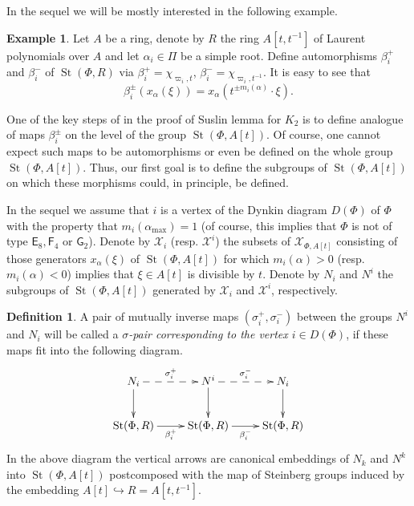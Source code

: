 \documentclass[oneside, 10pt]{amsart}
\DeclareMathOperator{\St}{St}
\DeclareMathOperator{\GL}{GL}
\newcommand{\rE}{\mathsf{E}}
\newcommand{\rF}{\mathsf{F}}
\newcommand{\rG}{\mathsf{G}}
\numberwithin{equation}{section}
\numberwithin{lemma}{section}
\theoremstyle{definition}
\newtheorem{dfn}[lemma]{Definition}
\newtheorem{example}[lemma]{Example}
\theoremstyle{remark}
\begin{document}
In the sequel we will be mostly interested in the following example.
\begin{example}
Let $A$ be a ring, denote by $R$ the ring $A[t, t^{-1}]$ of Laurent polynomials over $A$ and let $\alpha_i \in \Pi$ be a simple root.
Define automorphisms $\beta_i^+$ and $\beta_i^-$ of $\St(\Phi, R)$ via $\beta_i^+ = \chi_{\varpi_i, t}$, $\beta_i^- = \chi_{\varpi_i, t^{-1}}$.
It is easy to see that
\begin{equation}\label{eq:sigma_act} \beta_i^\pm(x_\alpha(\xi)) = x_\alpha(t^{\pm m_i(\alpha)} \cdot \xi).\end{equation}
\end{example}

One of the key steps of in the proof of Suslin lemma for $K_2$ is to define analogue of maps $\beta_i^\pm$ on the level of the group $\St(\Phi, A[t])$.
Of course, one cannot expect such maps to be automorphisms or even be defined on the whole group $\St(\Phi, A[t])$.
Thus, our first goal is to define the subgroups of $\St(\Phi, A[t])$ on which these morphisms could, in principle, be defined.

In the sequel we assume that $i$ is a vertex of the Dynkin diagram $D(\Phi)$ of $\Phi$ with the property that $m_i(\alpha_{\max})=1$ (of course, this implies that $\Phi$ is not of type $\rE_8, \rF_4$ or $\rG_2$).
Denote by $\mathcal{X}_i$ (resp. $\mathcal{X}^i$) the subsets of $\mathcal{X}_{\Phi, A[t]}$ consisting of those generators $x_{\alpha}(\xi)$ of $\St(\Phi, A[t])$ for which 
$m_i(\alpha) > 0$ (resp. $m_i(\alpha)<0$) implies that $\xi \in A[t]$ is divisible by $t$.
Denote by $N_i$ and $N^i$ the subgroups of $\St(\Phi, A[t])$ generated by $\mathcal{X}_i$ and $\mathcal{X}^i$, respectively.

\begin{dfn} A pair of mutually inverse maps $(\sigma_i^+, \sigma_i^-)$ between the groups $N^i$ and $N_i$ will be called a {\it $\sigma$-pair corresponding to the vertex $i\in D(\Phi)$},
 if these maps fit into the following diagram.
\begin{equation} \label{eq:sigma-diagram}
\xymatrix{ N_i\ar@{-->}[r]^{\sigma_i^+}\ar[d] & N^i \ar[d] \ar@{-->}[r]^{\sigma_i^-} & N_i \ar[d] \\ 
          \St(\Phi, R) \ar@<-0.0ex>[r]_{\beta_i^+} & \St(\Phi, R) \ar@<-0.0ex>[r]_{\beta_i^-} & \St(\Phi, R)} 
\end{equation}
In the above diagram the vertical arrows are canonical embeddings of $N_k$ and $N^k$ into $\St(\Phi, A[t])$ postcomposed with 
 the map of Steinberg groups induced by the embedding $A[t] \hookrightarrow R = A[t, t^{-1}]$.
\end{dfn}
\end{document}
